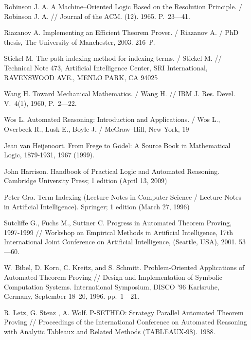 \begin{thebibliography}{99}
 Robinson J. A. A Machine--Oriented Logic Based on the Resolution Principle. / Robinson J. A. //  Journal of the ACM. (12). 1965. P.~23---41.

 Riazanov A. Implementing an Efficient Theorem Prover. / Riazanov A. /  PhD thesis, The University of Manchester, 2003. 216~P.

 Stickel M. The path-indexing method for indexing terms. / Stickel M. // Technical Note 473, Artificial Intelligence Center, SRI International, RAVENSWOOD AVE., MENLO PARK, CA 94025

 Wang H. Toward Mechanical Mathematics. / Wang H. // IBM J. Res. Devel. V.~4(1), 1960, P.~2---22.

 Wos L. Automated Reasoning: Introduction and Applications. / Wos L., Overbeek R., Lusk E.,  Boyle J. / McGraw--Hill,  New York, 19

 Jean van Heijenoort. From Frege to Gödel: A Source Book in Mathematical Logic, 1879-1931, 1967 (1999).

 John Harrison. Handbook of Practical Logic and Automated Reasoning. Cambridge University Press; 1 edition (April 13, 2009)

 Peter Gra. Term Indexing (Lecture Notes in Computer Science / Lecture Notes in Artificial Intelligence). Springer; 1 edition (March 27, 1996)


 Sutcliffe G., Fuchs M., Suttner C. Progress in Automated Theorem Proving, 1997-1999 // Workshop on Empirical Methods in Artificial Intelligence, 17th International Joint Conference on Artificial Intelligence, (Seattle, USA), 2001. 53---60.


 W. Bibel, D. Korn, C. Kreitz, and S. Schmitt. Problem-Oriented Applications of Automated Theorem Proving // Design and Implementation of Symbolic Computation Systems. International Symposium, DISCO '96 Karlsruhe, Germany, September 18–20, 1996. pp.~1---21. 

  R. Letz, G. Stenz , A. Wolf. P-SETHEO: Strategy Parallel Automated Theorem Proving // Proceedings of the International Conference on Automated Reasoning with Analytic Tableaux and Related Methods (TABLEAUX-98). 1988.


\end{thebibliography}
